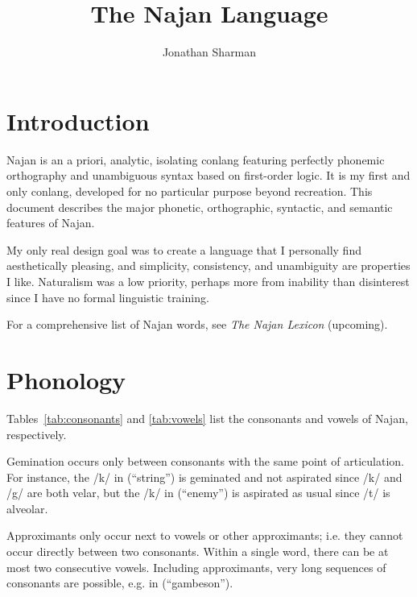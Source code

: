 \NewDocumentCommand{\down}{}{$\Downarrow$ \\}

\title{ \\ The Najan Language}
\author{Jonathan Sharman}



\listoftodos

\maketitle

\tableofcontents

\twocolumn

\section{Introduction}

Najan is an a priori, analytic, isolating conlang featuring perfectly phonemic
orthography and unambiguous syntax based on first-order logic. It is my first
and only conlang, developed for no particular purpose beyond recreation. This
document describes the major phonetic, orthographic, syntactic, and semantic
features of Najan.

My only real design goal was to create a language that I personally find
aesthetically pleasing, and simplicity, consistency, and unambiguity are
properties I like. Naturalism was a low priority, perhaps more from inability
than disinterest since I have no formal linguistic training.

For a comprehensive list of Najan words, see \emph{The Najan Lexicon}
(upcoming).

\section{Phonology} \label{sec:phonology}

Tables~\ref{tab:consonants} and \ref{tab:vowels} list the consonants and vowels
of Najan, respectively.

Gemination occurs only between consonants with the same point of articulation.
For instance, the /k/ in  (``string'') is geminated and not
aspirated since /k/ and /g/ are both velar, but the /k/ in 
(``enemy'') is aspirated as usual since /t/ is alveolar.

Approximants only occur next to vowels or other approximants; i.e. they cannot
occur directly between two consonants. Within a single word, there can be at
most two consecutive vowels. Including approximants, very long sequences of
consonants are possible, e.g. in  (``gambeson'').

